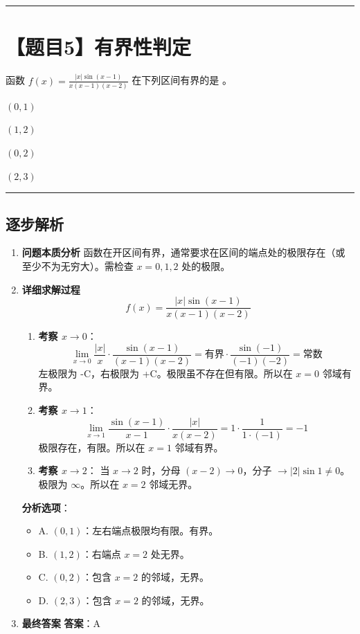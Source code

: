 \documentclass[UTF8]{ctexart}
\newenvironment{redenv}{\color{red}}{}
\newenvironment{detailedanalysis}{%
    \color{red}
    \begin{enumerate}[label=\textbf{第\arabic*步：}, leftmargin=*, align=left, itemsep=1.5ex]
}{%
    \end{enumerate}
}
\newcommand{\problemrule}{\noindent\rule{\textwidth}{1.5pt}\vspace{-0.8em}}
\newcommand{\analysisrule}{\noindent\rule{\textwidth}{0.8pt}\vspace{-0.8em}}
\newcommand{\choicesFour}[4]{
    \begin{enumerate}[label=\Alph*., itemsep=0pt, parsep=0pt, topsep=5pt, labelsep=0.5em]
        \begin{minipage}{0.22\linewidth} \item #1 \end{minipage}
        \begin{minipage}{0.22\linewidth} \item #2 \end{minipage}
        \begin{minipage}{0.22\linewidth} \item #3 \end{minipage}
        \begin{minipage}{0.22\linewidth} \item #4 \end{minipage}
    \end{enumerate}
}
\newcommand{\blank}[1]{\underline{\hspace{#1}}}
\begin{document}
\problemrule
\section*{【题目5】有界性判定}
函数 $ f(x)=\frac{|x|\sin(x-1)}{x(x-1)(x-2)} $ 在下列区间有界的是 \blank{1cm}。
\choicesFour{$ (0,1) $}{$ (1,2) $}{$ (0,2) $}{$ (2,3) $}

\begin{redenv}
\analysisrule
\subsection*{逐步解析}

\begin{detailedanalysis}
\item \textbf{问题本质分析}
函数在开区间有界，通常要求在区间的端点处的极限存在（或至少不为无穷大）。需检查 $x=0, 1, 2$ 处的极限。

\item \textbf{详细求解过程}
$$ f(x) = \frac{|x|\sin(x-1)}{x(x-1)(x-2)} $$
\begin{enumerate}[label=(\arabic*)]
\item \textbf{考察 $x \to 0$}：
$$ \lim_{x \to 0} \frac{|x|}{x} \cdot \frac{\sin(x-1)}{(x-1)(x-2)} = \text{有界} \cdot \frac{\sin(-1)}{(-1)(-2)} = \text{常数} $$
左极限为 -C，右极限为 +C。极限虽不存在但有限。所以在 $x=0$ 邻域有界。
\item \textbf{考察 $x \to 1$}：
$$ \lim_{x \to 1} \frac{\sin(x-1)}{x-1} \cdot \frac{|x|}{x(x-2)} = 1 \cdot \frac{1}{1 \cdot (-1)} = -1 $$
极限存在，有限。所以在 $x=1$ 邻域有界。
\item \textbf{考察 $x \to 2$}：
当 $x \to 2$ 时，分母 $(x-2) \to 0$，分子 $\to |2|\sin 1 \neq 0$。
极限为 $\infty$。所以在 $x=2$ 邻域无界。
\end{enumerate}

\textbf{分析选项}：
\begin{itemize}
    \item A. $(0, 1)$：左右端点极限均有限。有界。
    \item B. $(1, 2)$：右端点 $x=2$ 处无界。
    \item C. $(0, 2)$：包含 $x=2$ 的邻域，无界。
    \item D. $(2, 3)$：包含 $x=2$ 的邻域，无界。
\end{itemize}

\item \textbf{最终答案}
\textbf{答案}：A
\end{detailedanalysis}
\end{redenv}
\end{document}
